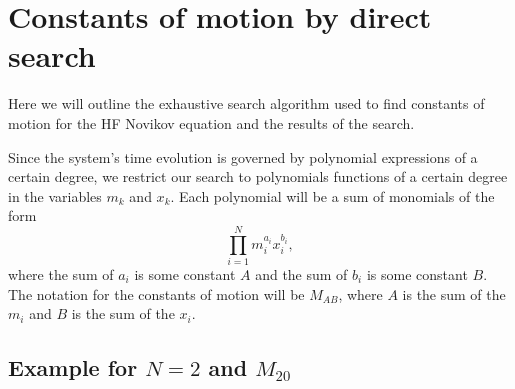 \documentclass[english,master]{liumaiex}
\theoremstyle{plain}
\theoremstyle{definition}
\begin{document}
\section{Constants of motion by direct search}

Here we will outline the exhaustive search algorithm used to find constants of motion for the HF Novikov equation and the results of the search.

Since the system's time evolution is governed by polynomial expressions of a certain degree, we restrict our search to polynomials functions of a certain degree in the variables $m_k$ and $x_k$. Each polynomial will be a sum of monomials of the form
\begin{equation}
	\prod_{i=1}^{N} m_i^{a_i} x_i^{b_i},
\end{equation} 
where the sum of $a_i$ is some constant $A$ and the sum of $b_i$ is some constant $B$. The notation for the constants of motion will be $M_{AB}$, where $A$ is the sum of the $m_i$ and $B$ is the sum of the $x_i$.




\subsection*{Example for $N = 2$ and $M_{20}$}
\end{document}
